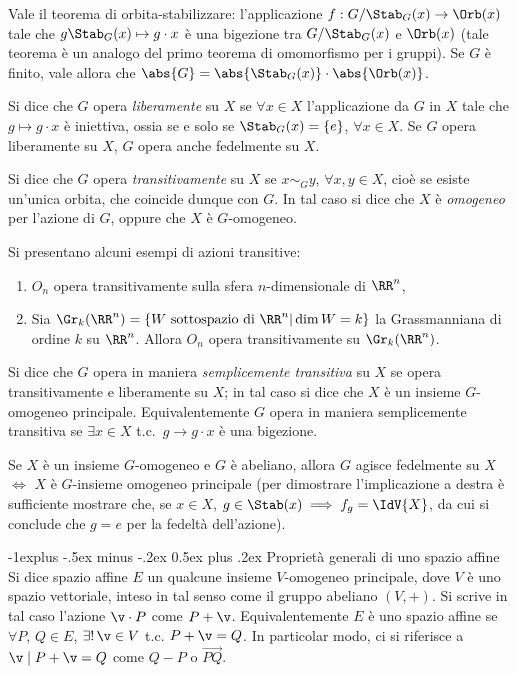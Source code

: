 \documentclass[10pt,landscape]{article}
\makeatletter
\renewcommand{\subsection}{\@startsection{subsection}{2}{0mm}%
	{-1explus -.5ex minus -.2ex}%
	{0.5ex plus .2ex}%
	{\normalfont\normalsize\bfseries}}
\makeatother
\begin{document}
\begin{multicols}{3}
		Vale il teorema di orbita-stabilizzare: l'applicazione $f:G/\Stab_G(x) \rightarrow \Orb(x)$ tale che $g \Stab_G(x) \mapsto g \cdot x$ è una bigezione tra
		$G/\Stab_G(x)$ e $\Orb(x)$ (tale teorema è un analogo del primo teorema di
		omomorfismo per i gruppi). Se $G$ è finito, vale allora che $\abs{G} = \abs{\Stab_G(x)} \cdot \abs{\Orb(x)}$.
		
		Si dice che $G$ opera \textit{liberamente} su $X$ se $\forall x \in X$ l'applicazione
		da $G$ in $X$ tale che $g \mapsto g \cdot x$ è iniettiva, ossia se e solo se $\Stab_G(x)=\{e\}$, $\forall x \in X$. Se $G$ opera liberamente su $X$,
		$G$ opera anche fedelmente su $X$.
		
		Si dice che $G$ opera \textit{transitivamente }su $X$ se $x \sim_G y$, $\forall x,y \in X$, cioè se esiste un'unica orbita, che coincide dunque con $G$. In tal caso
		si dice che $X$ è \textit{omogeneo} per l'azione di $G$, oppure che
		$X$ è $G$-omogeneo.
		
		Si presentano alcuni esempi di azioni transitive:
		\begin{enumerate}
			\item $O_n$ opera transitivamente sulla sfera $n$-dimensionale di $\RR^n$,
			\item Sia $\Gr_k(\RR^n)=\{W \text{ sottospazio di } \RR^n | \dim W=k\}$ la Grassmanniana di ordine $k$ su $\RR^n$. Allora $O_n$ opera transitivamente su $\Gr_k(\RR^n)$.
		\end{enumerate}
		
		Si dice che $G$ opera in maniera \textit{semplicemente transitiva} su $X$ se opera transitivamente e liberamente su $X$; in tal caso si dice che $X$ è un insieme $G$-omogeneo principale. Equivalentemente $G$ opera in maniera semplicemente transitiva se $\exists x\in X$ t.c.~$g\rightarrow g \cdot x$ è una bigezione.
		
		Se $X$ è un insieme $G$-omogeneo e $G$ è abeliano, allora $G$ agisce fedelmente su $X$ $\iff$ $X$ è $G$-insieme omogeneo principale (per dimostrare l'implicazione a destra è sufficiente mostrare che, se $x \in X$, $g \in \Stab(x) \implies f_g = \IdV{X}$, da cui si conclude
		che $g = e$ per la fedeltà dell'azione).
		
		\subsection{Proprietà generali di uno spazio affine}
		Si dice spazio affine $E$ un qualcune insieme $V$-omogeneo principale, dove
		$V$ è uno spazio vettoriale, inteso in tal senso come il gruppo abeliano
		$(V, +)$. Si scrive in tal caso l'azione $\v \cdot P$ come $P + \v$. Equivalentemente $E$ è uno spazio affine se $\forall P$, $Q \in E$, $\exists! \, \v\in V$ t.c. $P + \v = Q$. In particolar modo, ci si riferisce a $\v \mid P + \v = Q$ come $Q - P$ o
		$\overrightarrow{PQ}$.
		

\end{multicols}
\end{document}
